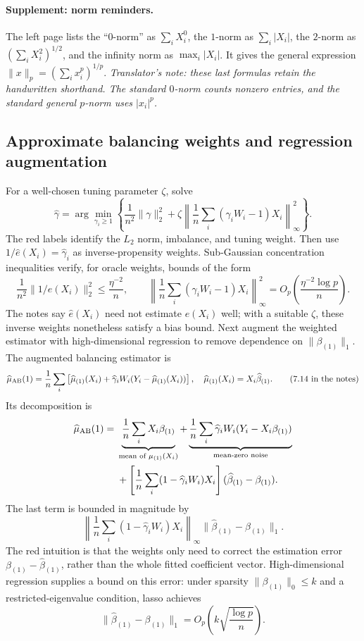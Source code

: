 \paragraph{Supplement: norm reminders.}
The left page lists the ``0-norm'' as $\sum_iX_i^0$, the $1$-norm as $\sum_i|X_i|$, the $2$-norm as $(\sum_iX_i^2)^{1/2}$, and the infinity norm as $\max_i|X_i|$. It gives the general expression $\|x\|_p=(\sum_i x_i^p)^{1/p}$.
\textit{Translator's note: these last formulas retain the handwritten shorthand. The standard $0$-norm counts nonzero entries, and the standard general $p$-norm uses $|x_i|^p$.}
\subsection{Approximate balancing weights and regression augmentation}
For a well-chosen tuning parameter $\zeta$, solve
\[
\widehat\gamma=\arg\min_{\gamma_i\geq1}
\left\{\frac1{n^2}\|\gamma\|_2^2+
\zeta\left\|\frac1n\sum_i(\gamma_iW_i-1)X_i\right\|_\infty^2\right\}.
\tag{7.12 in the notes}
\]
The red labels identify the $L_2$ norm, imbalance, and tuning weight. Then use $1/\widehat e(X_i)=\widehat\gamma_i$ as inverse-propensity weights. Sub-Gaussian concentration inequalities verify, for oracle weights, bounds of the form
\[
\frac1{n^2}\|1/e(X_i)\|_2^2\leq\frac{\eta^{-2}}n,
\qquad
\left\|\frac1n\sum_i(\gamma_iW_i-1)X_i\right\|_\infty^2
=O_p\left(\frac{\eta^{-2}\log p}{n}\right).
\]
The notes say $\widehat e(X_i)$ need not estimate $e(X_i)$ well; with a suitable $\zeta$, these inverse weights nonetheless satisfy a bias bound.
Next augment the weighted estimator with high-dimensional regression to remove dependence on $\|\beta_{(1)}\|_1$. The augmented balancing estimator is
\[
\widehat\mu_{\rm AB}(1)=\frac1n\sum_i
\left[\widehat\mu_{(1)}(X_i)+\widehat\gamma_iW_i(Y_i-\widehat\mu_{(1)}(X_i))\right],
\quad\widehat\mu_{(1)}(X_i)=X_i\widehat\beta_{(1)}.
\tag{7.14 in the notes}
\]
Its decomposition is
\begin{align*}
\widehat\mu_{\rm AB}(1)={}&\underbrace{\frac1n\sum_iX_i\beta_{(1)}}_{\text{mean of }\mu_{(1)}(X_i)}
+\underbrace{\frac1n\sum_i\widehat\gamma_iW_i(Y_i-X_i\beta_{(1)})}_{\text{mean-zero noise}}\\
&+\left[\frac1n\sum_i(1-\widehat\gamma_iW_i)X_i\right](\widehat\beta_{(1)}-\beta_{(1)}).
\end{align*}
The last term is bounded in magnitude by
\[
\left\|\frac1n\sum_i(1-\widehat\gamma_iW_i)X_i\right\|_\infty
\|\widehat\beta_{(1)}-\beta_{(1)}\|_1.
\]
The red intuition is that the weights only need to correct the estimation error $\beta_{(1)}-\widehat\beta_{(1)}$, rather than the whole fitted coefficient vector. High-dimensional regression supplies a bound on this error: under sparsity $\|\beta_{(1)}\|_0\leq k$ and a restricted-eigenvalue condition, lasso achieves
\[
\|\widehat\beta_{(1)}-\beta_{(1)}\|_1
=O_p\left(k\sqrt{\frac{\log p}{n}}\right).
\]
